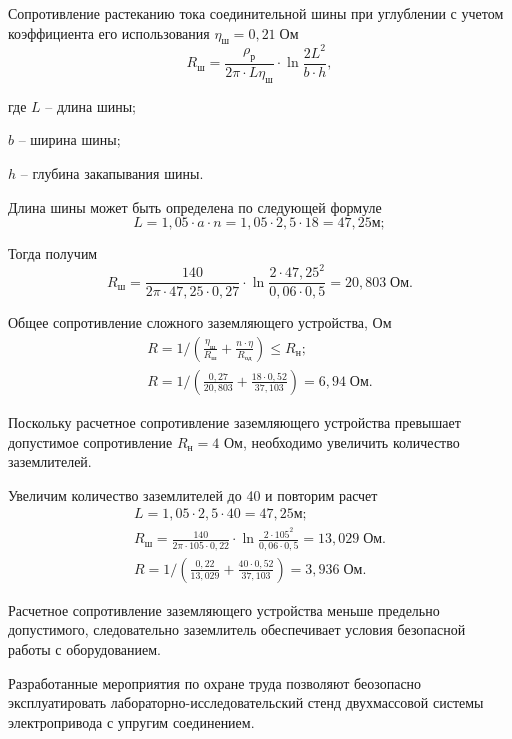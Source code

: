         Сопротивление растеканию тока соединительной шины при углублении с
        учетом коэффициента его использования $\eta_\text{ш} = 0,21 \;
        \text{Ом}$
        \begin{equation*}
            R_\text{ш} = \frac{\rho_\text{р}}{2\pi \cdot L \eta_\text{ш}}
                \cdot \ln \frac{2L^2}{b \cdot h},
        \end{equation*}

        где $L$ -- длина шины;\par
        $b$ -- ширина шины;\par
        $h$ -- глубина закапывания шины.

        Длина шины может быть определена по следующей формуле
        \begin{equation*}
            L = 1,05 \cdot a \cdot n = 1,05 \cdot 2,5 \cdot 18
                = 47,25 \text{м};
        \end{equation*}

        Тогда получим
        \begin{equation*}
            R_\text{ш} = \frac{140}{2\pi \cdot 47,25 \cdot 0,27} \cdot
                \ln \frac{2 \cdot 47,25^2}{0,06 \cdot 0,5}
                    = 20,803 \; \text{Ом}.
        \end{equation*}
        
        Общее сопротивление сложного заземляющего устройства, Ом
        \begin{gather*}
            R = 1 / \left( \frac{\eta_\text{ш}}{R_\text{ш}} +
                \frac{n \cdot \eta}{R_\text{од}} \right)
                    \leq R_\text{н};\\
            R = 1 / \left( \frac{0,27}{20,803} +
                \frac{18 \cdot 0,52}{37,103} \right)
                    = 6,94 \; \text{Ом}.
        \end{gather*}

        Поскольку расчетное сопротивление заземляющего устройства превышает
        допустимое сопротивление $R_\text{н} = 4$ %
        Ом, необходимо
        увеличить количество заземлителей.

        Увеличим количество заземлителей до 40 и повторим расчет
        \begin{gather*}
            L = 1,05 \cdot 2,5 \cdot 40
                = 47,25 \text{м};\\
            R_\text{ш} = \frac{140}{2\pi \cdot 105 \cdot 0,22} \cdot
                \ln \frac{2 \cdot 105^2}{0,06 \cdot 0,5}
                    = 13,029 \; \text{Ом}.\\
            R = 1 / \left( \frac{0,22}{13,029} +
                \frac{40 \cdot 0,52}{37,103} \right)
                    = 3,936 \; \text{Ом}.
        \end{gather*}

        Расчетное сопротивление заземляющего устройства меньше предельно
        допустимого, следовательно заземлитель обеспечивает условия безопасной
        работы с оборудованием.

        Разработанные мероприятия по охране труда позволяют беозопасно
        эксплуатировать лабораторно-исследовательский стенд двухмассовой
        системы электропривода с упругим соединением.

